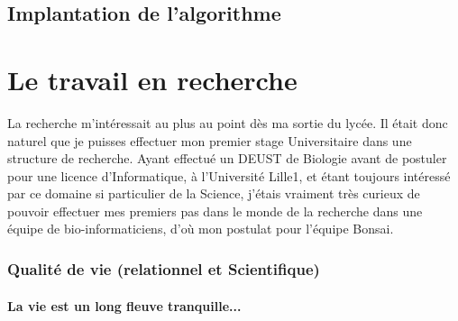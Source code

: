 \documentclass{report}
\begin{document}
\section{Implantation de l'algorithme}

\chapter{Le travail en recherche}

La recherche m'intéressait au plus au point dès ma sortie du lycée.
\newline
Il était donc naturel que je puisses effectuer mon premier stage Universitaire dans une structure de recherche. Ayant effectué un DEUST de Biologie avant de postuler pour une licence d'Informatique, à l'Université Lille1, et étant toujours intéressé par ce domaine si particulier de la Science, j'étais vraiment très curieux de pouvoir effectuer mes premiers pas dans le monde de la recherche dans une équipe de bio-informaticiens, d'où mon postulat pour l'équipe Bonsai.

\subsection{Qualité de vie (relationnel et Scientifique)}

\subsubsection{La vie est un long fleuve tranquille...}
\end{document}
